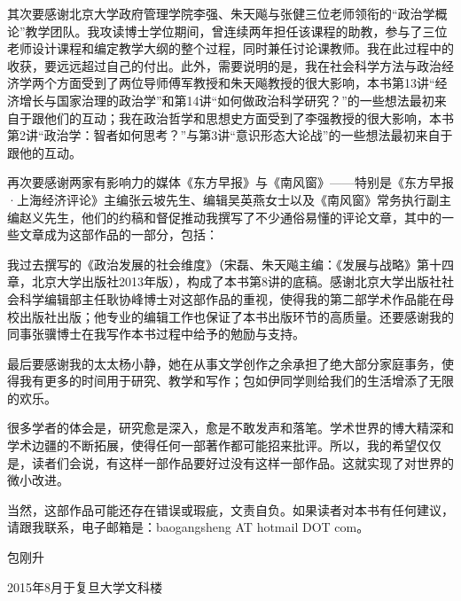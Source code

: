 其次要感谢北京大学政府管理学院李强、朱天飚与张健三位老师领衔的“政治学概论”教学团队。我攻读博士学位期间，曾连续两年担任该课程的助教，参与了三位老师设计课程和编定教学大纲的整个过程，同时兼任讨论课教师。我在此过程中的收获，要远远超过自己的付出。此外，需要说明的是，我在社会科学方法与政治经济学两个方面受到了两位导师傅军教授和朱天飚教授的很大影响，本书第13讲“经济增长与国家治理的政治学”和第14讲“如何做政治科学研究？”的一些想法最初来自于跟他们的互动；我在政治哲学和思想史方面受到了李强教授的很大影响，本书第2讲“政治学：智者如何思考？”与第3讲“意识形态大论战”的一些想法最初来自于跟他的互动。

再次要感谢两家有影响力的媒体《东方早报》与《南风窗》——特别是《东方早报·上海经济评论》主编张云坡先生、编辑吴英燕女士以及《南风窗》常务执行副主编赵义先生，他们的约稿和督促推动我撰写了不少通俗易懂的评论文章，其中的一些文章成为这部作品的一部分，包括：


我过去撰写的《政治发展的社会维度》（宋磊、朱天飚主编：《发展与战略》第十四章，北京大学出版社2013年版），构成了本书第8讲的底稿。感谢北京大学出版社社会科学编辑部主任耿协峰博士对这部作品的重视，使得我的第二部学术作品能在母校出版社出版；他专业的编辑工作也保证了本书出版环节的高质量。还要感谢我的同事张骥博士在我写作本书过程中给予的勉励与支持。

最后要感谢我的太太杨小静，她在从事文学创作之余承担了绝大部分家庭事务，使得我有更多的时间用于研究、教学和写作；包如伊同学则给我们的生活增添了无限的欢乐。

很多学者的体会是，研究愈是深入，愈是不敢发声和落笔。学术世界的博大精深和学术边疆的不断拓展，使得任何一部著作都可能招来批评。所以，我的希望仅仅是，读者们会说，有这样一部作品要好过没有这样一部作品。这就实现了对世界的微小改进。

当然，这部作品可能还存在错误或瑕疵，文责自负。如果读者对本书有任何建议，请跟我联系，电子邮箱是：baogangsheng AT hotmail DOT com。

\closing{包刚升}{2015年8月于复旦大学文科楼}
